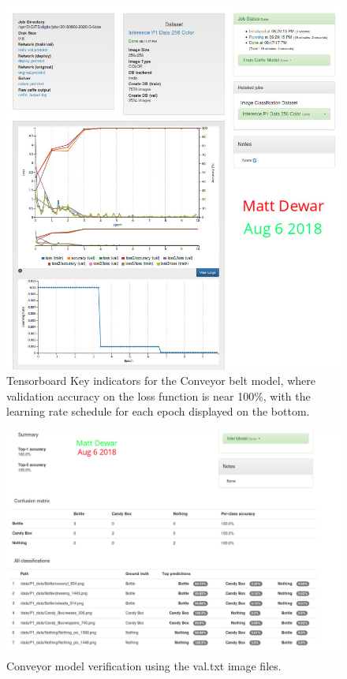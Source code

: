 \documentclass[10pt,journal,compsoc]{IEEEtran}
\begin{document}
\begin{figure}[thpb]
  \centering
  \includegraphics[width=\linewidth]{../img/P1-Dataset/P1-Model_GooGLeNet.jpg}
  \caption{Tensorboard Key indicators for the Conveyor belt model, where validation accuracy on the loss function is near 100\%, with the learning rate schedule for each epoch displayed on the bottom.}
  \label{ConveyorTB}
\end{figure}

\begin{figure}[thpb]
  \centering
  \includegraphics[width=\linewidth]{../img/P1-Dataset/P1-Prediction-Many.jpg}
  \caption{Conveyor model verification using the val.txt image files.}
  \label{ConveyorVerification}
\end{figure}
\end{document}

